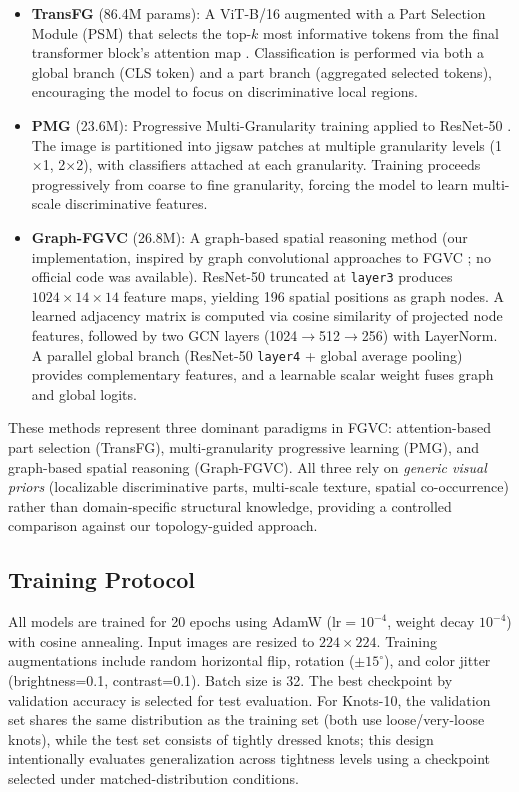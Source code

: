 \documentclass[preprint,review,12pt]{elsarticle}
\begin{document}
\begin{itemize}
    \item \textbf{TransFG} (86.4M params): A ViT-B/16 augmented with a Part Selection Module (PSM) that selects the top-$k$ most informative tokens from the final transformer block's attention map \citep{he2022transfg}. Classification is performed via both a global branch (CLS token) and a part branch (aggregated selected tokens), encouraging the model to focus on discriminative local regions.
    \item \textbf{PMG} (23.6M): Progressive Multi-Granularity training applied to ResNet-50 \citep{du2020pmg}. The image is partitioned into jigsaw patches at multiple granularity levels (1$\times$1, 2$\times$2), with classifiers attached at each granularity. Training proceeds progressively from coarse to fine granularity, forcing the model to learn multi-scale discriminative features.
    \item \textbf{Graph-FGVC} (26.8M): A graph-based spatial reasoning method (our implementation, inspired by graph convolutional approaches to FGVC \citep{zhuang2020apinet}; no official code was available). ResNet-50 truncated at \texttt{layer3} produces $1024 \times 14 \times 14$ feature maps, yielding 196 spatial positions as graph nodes. A learned adjacency matrix is computed via cosine similarity of projected node features, followed by two GCN layers \citep{kipf2017gcn} (1024$\to$512$\to$256) with LayerNorm. A parallel global branch (ResNet-50 \texttt{layer4} + global average pooling) provides complementary features, and a learnable scalar weight fuses graph and global logits.
\end{itemize}

These methods represent three dominant paradigms in FGVC: attention-based part selection (TransFG), multi-granularity progressive learning (PMG), and graph-based spatial reasoning (Graph-FGVC). All three rely on \emph{generic visual priors} (localizable discriminative parts, multi-scale texture, spatial co-occurrence) rather than domain-specific structural knowledge, providing a controlled comparison against our topology-guided approach.


\subsection{Training Protocol}
\label{sec:training}

All models are trained for 20 epochs using AdamW \citep{loshchilov2019adamw} ($\text{lr}=10^{-4}$, weight decay $10^{-4}$) with cosine annealing. Input images are resized to $224 \times 224$. Training augmentations include random horizontal flip, rotation ($\pm 15^{\circ}$), and color jitter (brightness=0.1, contrast=0.1). Batch size is 32. The best checkpoint by validation accuracy is selected for test evaluation. For Knots-10, the validation set shares the same distribution as the training set (both use loose/very-loose knots), while the test set consists of tightly dressed knots; this design intentionally evaluates generalization across tightness levels using a checkpoint selected under matched-distribution conditions.
\end{document}

